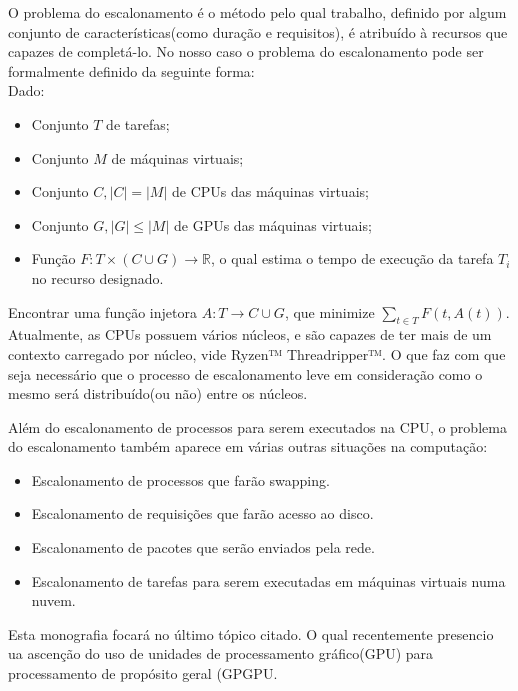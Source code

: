 O problema do escalonamento é o método pelo qual trabalho, definido por algum conjunto de características(como duração e requisitos), é atribuído à recursos que capazes de completá-lo. No nosso caso o problema do escalonamento pode ser formalmente definido da seguinte forma:\\
Dado:
\begin{itemize}
	\item Conjunto $T$ de tarefas;
	\item Conjunto $M$ de máquinas virtuais;
	\item Conjunto $C, |C| = |M|$ de CPUs das máquinas virtuais;
	\item Conjunto $G,  |G| \le |M|$ de GPUs das máquinas virtuais;
	\item Função $F: T \times (C \cup G) \to \mathbb{R}$, o qual estima o tempo de execução da tarefa $T_{i}$ no recurso designado.
\end{itemize}
Encontrar uma função injetora $A: T \to C \cup G$, que minimize $\sum_{t \in T} F(t, A(t) )$.\\
\iffalse
Por mais que exista a dificuldade teórica\cite{ULLMAN1975384}, isso não impediu a evolução dos Sistemas Operacionais, os quais foram capazes de fazer escalonamento de vários processos mesmo na época de \acrfull{CPU}s tinham apenas um núcleo. Popularizando dessa forma os computadores pessoais na década de 80.
\fi
Atualmente, as \acrshort{CPU}s possuem vários núcleos, e são capazes de ter mais de um contexto carregado por núcleo, vide Ryzen™ Threadripper™\cite{Ryzen}. O que faz com que seja necessário que o processo de escalonamento leve em consideração como o mesmo será distribuído(ou não) entre os núcleos.

Além do escalonamento de processos para serem executados na \acrshort{CPU}, o problema do escalonamento também aparece em várias outras situações na computação:

\begin{itemize}
	\item Escalonamento de processos que farão swapping.
	\item Escalonamento de requisições que farão acesso ao disco.
	\item Escalonamento de pacotes que serão enviados pela rede.
	\item Escalonamento de tarefas para serem executadas em máquinas virtuais numa nuvem.
\end{itemize}

Esta monografia focará no último tópico citado. O qual recentemente presencio ua ascenção do uso de unidades de processamento gráfico(\acrfull{GPU}) para processamento de propósito geral (\acrfull{GPGPU}\cite{Dimitrov:2009:USA:1513895.1513907}\cite{Yang:2010:GCM:1809028.1806606}. 


